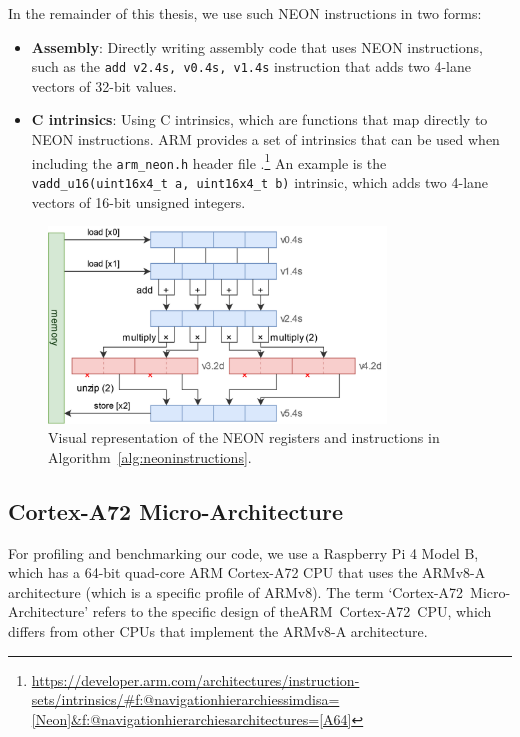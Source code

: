 \documentclass[11pt,a4paper]{report}
\theoremstyle{definition}
\begin{document}
\begin{algorithm}
  \caption{NEON instruction example (assembly)}
  \label{alg:neoninstructions}
  Assembler}, style=ASMStyle]{code/neon_example_asm.s}
\end{algorithm}

In the remainder of this thesis, we use such NEON instructions in two forms:
\begin{itemize}
  \item \textbf{Assembly}: Directly writing assembly code that uses NEON instructions, such as the \texttt{add v2.4s, v0.4s, v1.4s} instruction that adds two 4-lane vectors of 32-bit values.
  \item \textbf{C intrinsics}: Using C intrinsics, which are functions that map directly to NEON instructions. ARM provides a set of intrinsics that can be used when including the \texttt{arm\_neon.h} header file \cite{ArmNeonIntrinsicsRef}.\footnote{\url{https://developer.arm.com/architectures/instruction-sets/intrinsics/\#f:@navigationhierarchiessimdisa=[Neon]\&f:@navigationhierarchiesarchitectures=[A64]}} An example is the \texttt{vadd\_u16(uint16x4\_t a, uint16x4\_t b)} intrinsic, which adds two 4-lane vectors of 16-bit unsigned integers.
\end{itemize}

\begin{figure}
  \centering
  \includegraphics[width=0.8\textwidth]{neon/neon_example.drawio.png}
  \caption{Visual representation of the NEON registers and instructions in Algorithm~\ref{alg:neoninstructions}.}
  \label{fig:neonexample}
\end{figure}

\subsection{Cortex-A72 Micro-Architecture}
For profiling and benchmarking our code, we use a Raspberry Pi 4 Model B, which has a 64-bit quad-core ARM Cortex-A72 CPU that uses the \mbox{ARMv8-A} architecture (which is a specific profile of ARMv8). The term \mbox{`Cortex-A72 Micro-Architecture'} refers to the specific design of the\linebreak \mbox{ARM Cortex-A72 CPU}, which differs from other CPUs that implement the \mbox{ARMv8-A} architecture.
\end{document}
